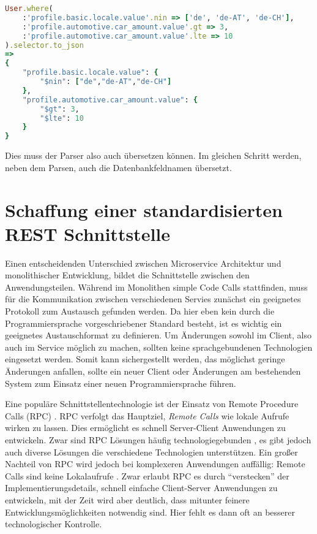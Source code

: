 \begin{lstlisting}[language=Ruby]
User.where(
    :'profile.basic.locale.value'.nin => ['de', 'de-AT', 'de-CH'],
    :'profile.automotive.car_amount.value'.gt => 3,
    :'profile.automotive.car_amount.value'.lte => 10
).selector.to_json
=> 
{
    "profile.basic.locale.value": {
        "$nin": ["de","de-AT","de-CH"]
    },
    "profile.automotive.car_amount.value": {
        "$gt": 3,
        "$lte": 10
    }
}
\end{lstlisting}

\noindent Dies muss der Parser also auch übersetzen können. Im gleichen Schritt werden, neben dem Parsen, auch die Datenbankfeldnamen übersetzt.

\section{Schaffung einer standardisierten REST Schnittstelle}
Einen entscheidenden Unterschied zwischen Microservice Architektur und monolithischer Entwicklung, bildet die Schnittstelle zwischen den Anwendungsteilen. Während im Monolithen simple Code Calls stattfinden, muss für die Kommunikation zwischen verschiedenen Servies zunächst ein geeignetes Protokoll zum Austausch gefunden werden.
Da hier eben kein durch die Programmiersprache vorgeschriebener Standard besteht, ist es wichtig ein geeignetes Austauschformat zu definieren.
Um Änderungen sowohl im Client, also auch im Service möglich zu machen, sollten keine sprachgebundenen Technologien eingesetzt werden. Somit kann sichergestellt werden, das möglichst geringe Änderungen anfallen, sollte ein neuer Client oder Änderungen am bestehenden System zum Einsatz einer neuen Programmiersprache führen.

Eine populäre Schnittstellentechnologie ist der Einsatz von Remote Procedure Calls (RPC) \cite{rpc}. RPC verfolgt das Hauptziel, \textit{Remote Calls} wie lokale Aufrufe wirken zu lassen. Dies ermöglicht es schnell Server-Client Anwendungen zu entwickeln. Zwar sind RPC Lösungen häufig technologiegebunden \cite[vgl.][Seite 46]{newman2015building}, es gibt jedoch auch diverse Lösungen die verschiedene Technologien unterstützen. Ein großer Nachteil von RPC wird jedoch bei komplexeren Anwendungen auffällig: Remote Calls sind keine Lokalaufrufe \cite[][Seite 47]{newman2015building}. Zwar erlaubt RPC es durch ``verstecken'' der Implementierungsdetails, schnell einfache Client-Server Anwendungen zu entwickeln, mit der Zeit wird aber deutlich, dass mitunter feinere Entwicklungsmöglichkeiten notwendig sind. Hier fehlt es dann oft an besserer technologischer Kontrolle.

